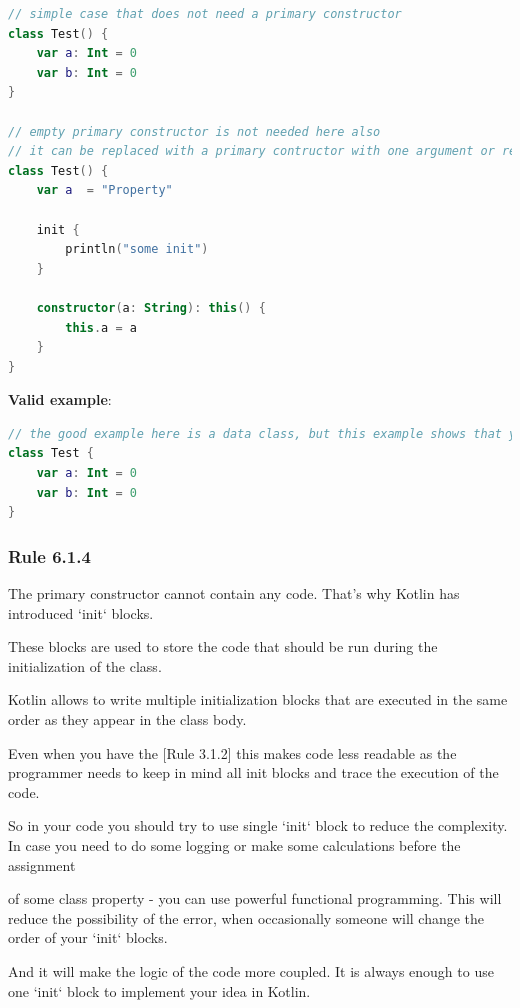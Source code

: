 {{{{\begin{lstlisting}[language=Kotlin]
// simple case that does not need a primary constructor
class Test() {
    var a: Int = 0
    var b: Int = 0
}

// empty primary constructor is not needed here also
// it can be replaced with a primary contructor with one argument or removed
class Test() {
    var a  = "Property"

    init {
        println("some init")
    }

    constructor(a: String): this() {
        this.a = a
    }
}
\end{lstlisting}


\textbf{Valid example}:

\begin{lstlisting}[language=Kotlin]
// the good example here is a data class, but this example shows that you should get rid of braces for primary constructor
class Test {
    var a: Int = 0
    var b: Int = 0
}
\end{lstlisting}


\subsubsection*{\textbf{Rule 6.1.4}}
\leavevmode\newline

The primary constructor cannot contain any code. That's why Kotlin has introduced `init` blocks.

These blocks are used to store the code that should be run during the initialization of the class.

Kotlin allows to write multiple initialization blocks that are executed in the same order as they appear in the class body.

Even when you have the [Rule 3.1.2] this makes code less readable as the programmer needs to keep in mind all init blocks and trace the execution of the code.

So in your code you should try to use single `init` block to reduce the complexity. In case you need to do some logging or make some calculations before the assignment 

of some class property - you can use powerful functional programming. This will reduce the possibility of the error, when occasionally someone will change the order of your `init` blocks. 

And it will make the logic of the code more coupled. It is always enough to use one `init` block to implement your idea in Kotlin.



}}}}
